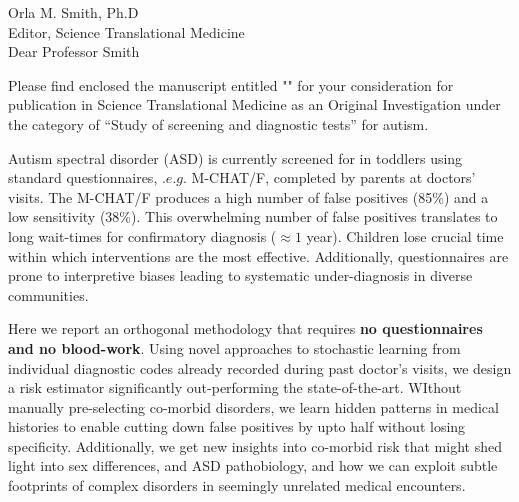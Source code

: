 \documentclass[9pt,onecolumn,compsoc]{IEEEtran}
\newcommand{\Space}{\vspace{10pt}}
\def\EDITOR{Orla M. Smith, Ph.D}
\def\BEDITOR{Professor Smith\xspace}
\def\JNAME{Science Translational Medicine\xspace}
\def\JADDR{}
\begin{document}
\parskip=12pt
\parindent=0pt
\Space
\Space
\fontsize{11}{12}\selectfont
\Space
\Space

\EDITOR\\
Editor, \JNAME\\
\JADDR

Dear \BEDITOR

Please find enclosed the  manuscript entitled "\textbf{\TITLE}" for your consideration for publication in \JNAME as an Original Investigation under the category of ``Study of screening and diagnostic tests'' for autism. 

Autism spectral disorder (ASD) is currently  screened for in toddlers using standard questionnaires, $.e.g.$ M-CHAT/F, completed by parents at doctors' visits. The M-CHAT/F produces a  high number of false positives (85\%) and  a low sensitivity (38\%). This overwhelming number of false positives translates to long wait-times for confirmatory diagnosis ($\approx 1$ year). Children lose crucial time within which  interventions are the most effective.  Additionally, questionnaires are prone to interpretive biases leading to systematic under-diagnosis in diverse communities.  %

Here we report an orthogonal methodology that requires \textbf{no questionnaires and no blood-work}. Using novel approaches to stochastic learning from  individual diagnostic codes already recorded during past doctor's visits, we design  a  risk estimator significantly out-performing the state-of-the-art. WIthout manually pre-selecting co-morbid disorders, we learn hidden patterns in medical histories to enable cutting down false positives by upto half without losing specificity.
Additionally, we get new insights into co-morbid risk that might shed light into sex differences, and ASD pathobiology, and how we can exploit subtle footprints of complex disorders in seemingly unrelated
medical encounters.

\end{document}
